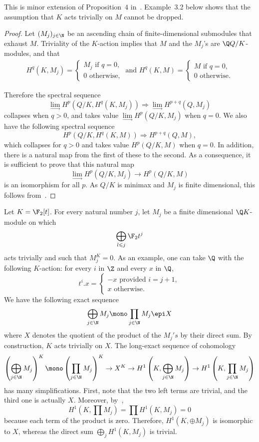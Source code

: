 This is minor extension of Proposition~$4$ in~\cite{K84}. Example~3.2 below shows that the assumption that $K$ acts trivially on $M$ cannot be dropped.
\begin{proof}
Let $(M_j)_{j\in \N}$ be an ascending chain of finite-dimensional submodules that exhaust $M$. Triviality of the $K$-action implies that $M$ and the $M_j$'s are $\Q Q/K$-modules, and that
\begin{align*}
H^q(K, M_j) =
\begin{cases}
M_j \text{ if } q = 0, \\
0 \text{ otherwise,}
\end{cases} \text{ and } H^q(K, M) =
\begin{cases}
M \text{ if } q = 0, \\
0 \text{ otherwise.}
\end{cases}
\end{align*}

Therefore the spectral sequence
\[
\lim_\rightarrow H^p(Q/K, H^q(K, M_j)) \Rightarrow \lim_\rightarrow H^{p+q}(Q, M_j)
\]
collapses when $q > 0$, and takes value $ \lim\limits_\rightarrow H^p(Q/K, M_j)$ when $q=0$. We also have the following spectral sequence
\[
H^p(Q/K, H^q(K, M)) \Rightarrow H^{p+q}(Q, M),
\]
which collapses for $q > 0$ and takes value $H^p(Q/K, M)$ when $q = 0$. In addition, there is a natural map from the first of these to the second. As a consequence, it is sufficient to prove that this natural map
\[
\lim_\rightarrow H^p(Q/K, M_j) \rightarrow H^p(Q/K, M)
\]
is an isomorphism for all $p$. As $Q/K$ is minimax and $M_j$ is finite dimensional, this follows from~\cite[Proposition~$4$]{K84}.
\end{proof}

\begin{exam}
Let $K = \F_2[t]$. For every natural number $j$, let $M_j$ be a finite dimensional $\Q K$-module on which
\[
\bigoplus_{l \leqslant j} \F_2 t^j
\]
acts trivially and such that $M_j^K =0$. As an example, one can take $\Q$ with the following $K$-action: for every $i$ in $\Z$ and every $x$ in $\Q$,
\[
t^i.x =
\begin{cases}
- x \text{ provided } i = j + 1, \\
x \text{ otherwise.}
\end{cases}
\]
We have the following exact sequence
\[
\bigoplus_{j\in\N} M_j \mono \prod_{j\in\N} M_j \epi X
\]
where $X$ denotes the quotient of the product of the $M_j's$ by their direct sum. By construction, $K$ acts trivially on $X$. The long-exact sequence of cohomology
\[
\left(\bigoplus_{j\in\N} M_j\right)^K \mono \left(\prod_{j\in\N} M_j\right)^K \rightarrow X^K \rightarrow H^1\left(K, \bigoplus_{j\in\N} M_j\right) \rightarrow H^1\left(K, \prod_{j\in\N} M_j\right)
\]
has many simplifications. First, note that the two left terms are trivial, and the third one is actually $X$. Moreover, by~\cite{B},
\[
H^1(K, \prod M_j) = \prod H^1(K, M_j) =0
\]
because each term of the product is zero. Therefore, $H^1(K, \oplus M_j)$ is isomorphic to $X$, whereas the direct sum $\bigoplus_j H^1(K, M_j)$ is trivial.
\end{exam}



